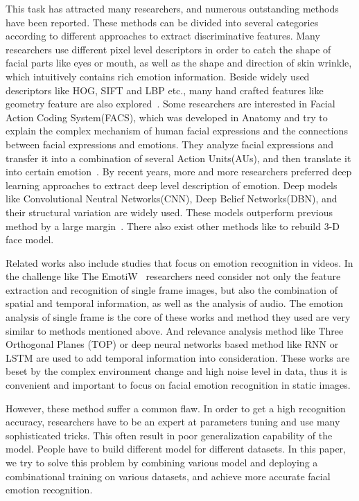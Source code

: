 \documentclass[conference]{IEEEtran}
\begin{document}
This task has attracted many researchers, and numerous outstanding methods have been reported. These methods can be divided into several categories according to different approaches to extract discriminative features. Many researchers use different pixel level descriptors in order to catch the shape of facial parts like eyes or mouth, as well as the shape and direction of skin wrinkle, which intuitively contains rich emotion information. Beside widely used descriptors like HOG, SIFT and LBP etc., many hand crafted features like geometry feature are also explored~\cite{Kaya2017Video,Kaya2015Contrasting,Saeed2012Effective}. Some researchers are interested in Facial Action Coding System(FACS), which was developed in Anatomy and try to explain the complex mechanism of human facial expressions and the connections between facial expressions and emotions. They analyze facial expressions and transfer it into a combination of several Action Units(AUs), and then translate it into certain emotion~\cite{Yao2015Capturing,Bartlett2005Recognizing}. By recent years, more and more researchers preferred deep learning approaches to extract deep level description of emotion. Deep models like Convolutional Neutral Networks(CNN), Deep Belief Networks(DBN), and their structural variation are widely used. These models outperform previous method by a large margin~\cite{Kahou2013Combining,Fan2016Video,Yao2016HoloNet}. There also exist other methods like to rebuild 3-D face model.

Related works also include studies that focus on emotion recognition in videos. In the challenge like The EmotiW~\cite{Dhall2016EmotiW} researchers need consider not only the feature extraction and recognition of single frame images, but also the combination of spatial and temporal information, as well as the analysis of audio. The emotion analysis of single frame is the core of these works and method they used are very similar to methods mentioned above. And relevance analysis method like Three Orthogonal Planes (TOP) \cite{Kaya2017Video} or deep neural networks based method like RNN \cite{Kahou2015Recurrent} or LSTM are used to add temporal information into consideration. These works are beset by the complex environment change and high noise level in data, thus it is convenient and important to focus on facial emotion recognition in static images.

However, these method suffer a common flaw. In order to get a high recognition accuracy, researchers have to be an expert at parameters tuning and use many sophisticated tricks. This often result in poor generalization capability of the model. People have to build different model for different datasets. In this paper, we try to solve this problem by combining various model and deploying a combinational training on various datasets, and achieve more accurate facial emotion recognition.
\end{document}
